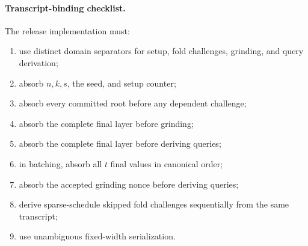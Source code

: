 \paragraph{Transcript-binding checklist.}
The release implementation must:
\begin{enumerate}
\item use distinct domain separators for setup, fold challenges, grinding,
and query derivation;
\item absorb \(n,k,s\), the seed, and setup counter;
\item absorb every committed root before any dependent challenge;
\item absorb the complete final layer before grinding;
\item absorb the complete final layer before deriving queries;
\item in batching, absorb all \(t\) final values in canonical order;
\item absorb the accepted grinding nonce before deriving queries;
\item derive sparse-schedule skipped fold challenges sequentially from the
same transcript;
\item use unambiguous fixed-width serialization.
\end{enumerate}
